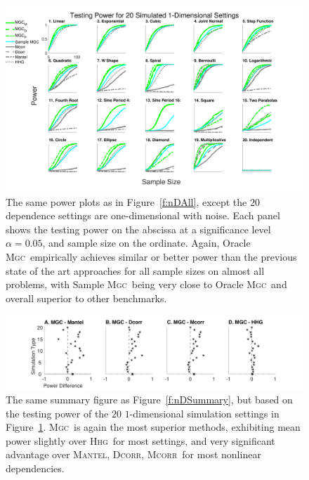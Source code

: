 \documentclass[11pt]{article}
\providecommand{\sct}[1]{{\normalfont\textsc{#1}}}
\newcommand{\Mgc}{\sct{Mgc}}
\newcommand{\Hhg}{\sct{Hhg}}
\newcommand{\Dcorr}{\sct{Dcorr}}
\newcommand{\Mcorr}{\sct{Mcorr}}
\newcommand{\Mantel}{\sct{Mantel}}
\begin{document}
\begin{figure}[htbp]
\includegraphics[width=1.0\textwidth,trim={0 0.5cm 4cm 0},clip]{Figures/Fig1DPowerAll}
\caption{
The same power plots as in Figure~\ref{f:nDAll}, except the $20$ dependence settings are one-dimensional with noise.
Each panel shows the testing power on the abscissa at a significance level $\alpha=0.05$, and sample size on the ordinate.
Again, Oracle \Mgc~empirically achieves similar or better power than the previous state of the art approaches for all sample sizes on almost all problems, with Sample \Mgc~being very close to Oracle \Mgc~and overall superior to other benchmarks.}
\label{f:1DAll}
\end{figure}

\begin{figure}
  \centering
  \includegraphics[width=1.0\textwidth,trim={3.5cm 0 3.5cm 0},clip]{Figures/Fig1DPowerMGCM}
  \caption{The same summary figure as Figure~\ref{f:nDSummary}, but based on the testing power of the $20$ $1$-dimensional simulation settings in Figure~\ref{f:1DAll}. 
  \Mgc~is again the most superior methods, exhibiting mean power slightly over \Hhg~for most settings, and very significant advantage over \Mantel, \Dcorr, \Mcorr~for most nonlinear dependencies.}
\label{f:1DSummary}
\end{figure}
\end{document}
